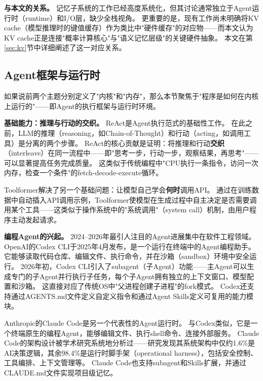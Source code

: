 \textbf{与本文的关系。}
记忆子系统的工作已经高度系统化，但其讨论通常独立于Agent运行时（runtime）和I/O层，缺少全栈视角。
更重要的是，现有工作尚未明确将KV cache（模型推理时的键值缓存）作为类比中"硬件缓存"的对应物——而本文认为KV cache正是连接"概率计算核心"与"语义记忆层级"的关键硬件抽象。
本文在第\ref{sec:kv}节中详细阐述了这一对应关系。

\subsection{Agent框架与运行时}
\label{sec:related-agent-framework}

如果说前两个主题分别定义了"内核"和"内存"，那么本节聚焦于"程序是如何在内核上运行的"——即Agent的执行框架与运行时环境。

\textbf{基础能力：推理与行动的交织。}
ReAct\cite{yao2023react}是Agent执行范式的基础性工作。
在此之前，LLM的推理（reasoning，如Chain-of-Thought）和行动（acting，如调用工具）是分离的两个步骤。
ReAct的核心贡献是证明：将推理和行动\textbf{交织}（interleave）在同一流程中——即"思考一步，行动一步，观察结果，再思考"——可以显著提高任务完成质量。
这类似于传统编程中"CPU执行一条指令，访问一次内存，检查一个条件"的fetch-decode-execute循环。

Toolformer\cite{schick2023toolformer}解决了另一个基础问题：让模型自己学会\textbf{何时}调用API。
通过在训练数据中自动插入API调用示例，Toolformer使模型在生成过程中自主决定是否需要调用某个工具——这类似于操作系统中的"系统调用"（system call）机制，由用户程序主动发起请求。

\textbf{编程Agent的兴起。}
2024--2026年最引人注目的Agent进展集中在软件工程领域。
OpenAI的Codex CLI\cite{openai_codex_overview_2026}于2025年4月发布，是一个运行在终端中的Agent编程助手。
它能够读取代码仓库、编辑文件、执行命令，并在沙箱（sandbox）环境中安全运行\cite{openai_codex_sandbox_2026}。
2026年初，Codex CLI引入了subagent（子Agent）功能\cite{openai_codex_subagents_2026}——主Agent可以生成专门的子Agent并行执行子任务，每个子Agent拥有独立的上下文窗口、模型配置和沙箱。
这直接对应了传统OS中"父进程创建子进程"的fork模式。
Codex还支持通过AGENTS.md文件定义自定义指令\cite{openai_codex_agents_md_2026}和通过Agent Skills定义可复用的能力模块\cite{openai_codex_skills_2026}。

Anthropic的Claude Code\cite{anthropic_claudecode_overview_2026}是另一个代表性的Agent运行时。
与Codex类似，它是一个终端原生的编程Agent，能够编辑文件、执行shell命令、连接外部服务。
Claude Code的架构设计被学术研究系统地分析过\cite{dive_claudecode_2026}——研究发现其系统架构中仅约1.6\%是AI决策逻辑，其余98.4\%是运行时脚手架（operational harness），包括安全控制、工具编排、上下文管理等。
Claude Code也支持subagent\cite{anthropic_claudecode_subagents_2026}和Skills\cite{anthropic_claudecode_skills_2026}扩展，并通过CLAUDE.md文件实现项目级记忆\cite{anthropic_claudecode_memory_2026}。


